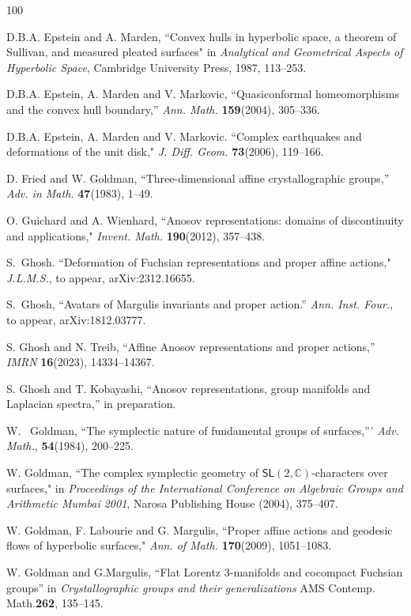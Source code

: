 \documentclass{amsart}
\theoremstyle{plain}
\theoremstyle{definition}
\theoremstyle{remark}
\renewcommand{\sf}[1]{{\mathsf{#1}}}
\newcommand{\C}{\mathbb C}
\newcommand{\<}{\left <}
\renewcommand{\>}{\right >}
\renewcommand{\C}{\mathbb C}
\begin{document}
\begin{thebibliography}{100}
\begin{scriptsize}
 D.B.A. Epstein and A. Marden, ``Convex hulls in hyperbolic space, a theorem of Sullivan, and measured pleated surfaces" 
in {\em Analytical and Geometrical Aspects of Hyperbolic Space}, Cambridge University Press, 1987, 113--253.

 D.B.A. Epstein, A. Marden and V. Markovic, ``Quasiconformal homeomorphisms and the convex hull boundary,''
{\em Ann. Math.} {\bf 159}(2004), 305--336.

 D.B.A. Epstein, A. Marden and V. Markovic. ``Complex earthquakes and deformations of the unit disk,"
{\em J. Diff. Geom.} {\bf 73}(2006),  119--166.

 D. Fried and W. Goldman, ``Three-dimensional affine crystallographic groups,''
{\em Adv. in Math.} {\bf 47}(1983),  1--49.


 O. Guichard and A. Wienhard, ``Anosov representations: domains of discontinuity and applications," {\em Invent. Math.} {\bf 190}(2012), 357--438.

 S.~Ghosh. ``Deformation of Fuchsian representations and proper affine actions," {\em J.L.M.S.}, to appear, arXiv:2312.16655.

S.~Ghosh, ``Avatars of Margulis invariants and proper action.'' {\em Ann. Inst. Four.}, to appear, arXiv:1812.03777.

 S. Ghosh and N. Treib, ``Affine Anosov representations and proper actions,'' {\em IMRN}  {\bf 16}(2023), 14334--14367.

 S. Ghosh and T. Kobayashi, ``Anosov representations, group manifolds and Laplacian spectra,'' in preparation.

W.~ Goldman, ``The symplectic nature of fundamental groups of surfaces,''' {\em Adv. Math.},
{\bf 54}(1984), 200--225.

 W. Goldman, ``The complex symplectic geometry of $\sf{SL}(2, \C)$-characters over
surfaces," in {\em Proceedings of the International Conference on Algebraic Groups and Arithmetic Mumbai 2001}, 
Narosa Publishing House (2004), 375--407.


 W.  Goldman, F. Labourie and G. Margulis, ``Proper affine actions and geodesic flows of hyperbolic surfaces," {\em Ann. of Math.} {\bf 170}(2009),  1051--1083.

 W. Goldman and G.Margulis, ``Flat Lorentz 3-manifolds and cocompact Fuchsian groups'' in
{\em Crystallographic groups and their generalizations}  AMS Contemp. Math.{\bf 262}, 135--145.






\end{scriptsize}
\end{thebibliography}
\end{document}
